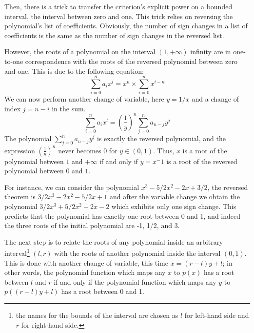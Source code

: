 \documentclass{article}
\begin{document}
Then, there is a trick to transfer the criterion's explicit power on a
bounded interval, the interval between zero and one. This trick relies
on reversing the polynomial's list of coefficients.  Obviously, the
number of sign changes in a list of coefficients is the same as the
number of sign changes in the reversed list.

However, the roots of a polynomial on the interval \((1,+\infty)\)
infinity are in one-to-one correspondence with the roots of the
reversed polynomial between zero and one. This is due to the following
equation:
\[\sum_{i=0}^{n}a_i x^i = x^n\times\sum_{i=0}^{n}x^{i-n}\]
We can now perform another change of variable, here \(y=1/x\) and a
change of index \(j=n-i\) in the sum.
\[\sum_{i=0}^{n}a_i x^l = (\frac{1}{y})^n \sum_{j=0}^{n}a_{n-j} y^j\]
The polynomial \(\sum_{j=0}^{n} a_{n-j}y^j\) is exactly the reversed
polynomial, and the expression \((\frac{1}{y})^n\) never becomes 0 for
\(y\in (0,1)\).  Thus, \(x\) is a root of the polynomial between \(1\)
and \(+\infty\) if and only if \(y=x^-1\) is a root of the reversed
polynomial between \(0\) and \(1\).

For instance, we can consider the polynomial \(x^3 - 5/2 x^2 - 2 x + 3/2\),
the reversed theorem is \(3/2 x^3 - 2 x^2 - 5/2 x + 1\) and after 
the variable change we obtain the polynomial \(3/2 x^3 + 5/2 x^2 - 2 x - 2\)
which exhibits only one sign change.  This predicts that the polynomial has
exactly one root between 0 and 1, and indeed the three roots of the initial
polynomial are -1, 1/2, and 3.

The next step is to relate the roots of any polynomial inside an
arbitrary interval\footnote{the names for the bounds of the interval
  are chosen as \(l\) for left-hand side and \(r\) for right-hand
  side.} \((l,r)\) with the roots of another polynomial inside the
interval \((0,1)\).  This is done with another change of variable,
this time \(x= (r-l) y + l\); in other words, the polynomial function
which maps any \(x\) to \(p(x)\) has a root between \(l\) and \(r\) if
and only if the polynomial function which maps any \(y\) to \(p((r -
l) y + l)\) has a root between 0 and 1.
\end{document}
